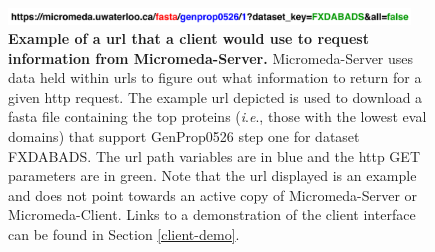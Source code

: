 \begin{figure}[!ht]
  \centering
	\includegraphics[width=0.95\textwidth]{media/Coloured-Endpoint.pdf}
     \caption[Example of a URL that a client would use to request information 
from Micromeda-Server.]{\textbf{Example of a \gls{url} that a client would use 
to request information from Micromeda-Server.} Micromeda-Server uses data held 
within \gls{url}s to figure out what information to return for a given 
\gls{http} request. The example \gls{url} depicted is used to download a 
\gls{fasta} file containing the top proteins (\textit{i}.\textit{e}., those with 
the lowest \gls{eval}  domains) that support GenProp0526 step one for dataset 
FXDABADS. The \gls{url} path variables are in blue and the \gls{http} GET 
parameters are in green. Note that the \gls{url} displayed is an example and does 
not point towards an active copy of Micromeda-Server or Micromeda-Client. Links 
to a demonstration of the client interface can be found in Section 
\ref{client-demo}.}
	 \label{fig:endpoint-url}
\end{figure}

